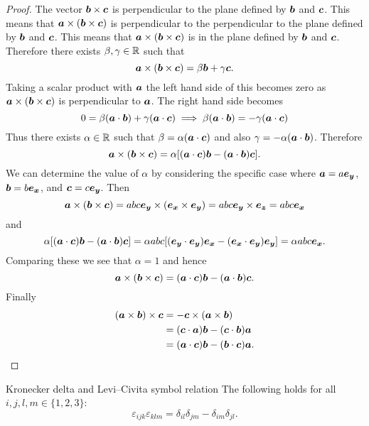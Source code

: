 \begin{proof}
    The vector \(\bm{b}\times\bm{c}\) is perpendicular to the plane defined by \(\bm{b}\) and \(\bm{c}\).
    This means that \(\bm{a}\times(\bm{b}\times\bm{c})\) is perpendicular to the perpendicular to the plane defined by \(\bm{b}\) and \(\bm{c}\).
    This means that \(\bm{a}\times(\bm{b}\times\bm{c})\) is in the plane defined by \(\bm{b}\) and \(\bm{c}\).
    Therefore there exists \(\beta, \gamma\in\mathbb{R}\) such that
    \[\bm{a}\times(\bm{b}\times\bm{c}) = \beta\bm{b} + \gamma\bm{c}.\]
    Taking a scalar product with \(\bm{a}\) the left hand side of this becomes zero as \(\bm{a}\times(\bm{b}\times\bm{c})\) is perpendicular to \(\bm{a}\).
    The right hand side becomes
    \[0 = \beta(\bm{a}\cdot\bm{b}) + \gamma(\bm{a}\cdot\bm{c}) \implies \beta(\bm{a}\cdot\bm{b}) = -\gamma(\bm{a}\cdot\bm{c})\]
    Thus there exists \(\alpha\in\mathbb{R}\) such that \(\beta = \alpha(\bm{a}\cdot\bm{c})\) and also \(\gamma = -\alpha(\bm{a}\cdot\bm{b})\).
    Therefore
    \[\bm{a}\times(\bm{b}\times\bm{c}) = \alpha[(\bm{a}\cdot\bm{c})\bm{b} - (\bm{a}\cdot\bm{b})\bm{c}].\]
    We can determine the value of \(\alpha\) by considering the specific case where \(\bm{a} = a\bm{e_{y}}\), \(\bm{b} = b\bm{e_{x}}\), and \(\bm{c} = c\bm{e_{y}}\).
    Then
    \[\bm{a}\times(\bm{b}\times\bm{c}) = abc\bm{e_{y}}\times(\bm{e_{x}}\times\bm{e_{y}}) = abc\bm{e_{y}}\times\bm{e_{z}} = abc\bm{e_{x}}\]
    and
    \[\alpha[(\bm{a}\cdot\bm{c})\bm{b} - (\bm{a}\cdot\bm{b})\bm{c}] = \alpha abc[(\bm{e_{y}}\cdot\bm{e_{y}})\bm{e_{x}} - (\bm{e_{x}}\cdot\bm{e_{y}})\bm{e_{y}}] = \alpha abc\bm{e_{x}}.\]
    Comparing these we see that \(\alpha = 1\) and hence
    \[\bm{a}\times(\bm{b}\times\bm{c}) = (\bm{a}\cdot\bm{c})\bm{b} - (\bm{a}\cdot\bm{b})\bm{c}.\]
    Finally
    \begin{align*}
        (\bm{a}\times\bm{b})\times\bm{c} &= -\bm{c}\times(\bm{a}\times\bm{b})\\
        &= (\bm{c}\cdot\bm{a})\bm{b} - (\bm{c}\cdot\bm{b})\bm{a}\\
        &= (\bm{a}\cdot\bm{c})\bm{b} - (\bm{b}\cdot\bm{c})\bm{a}.
    \end{align*}
\end{proof}
\begin{corollary}{Kronecker delta and Levi--Civita symbol relation}{}
    The following holds for all \(i, j, l, m \in \{1, 2, 3\}\):
    \[\varepsilon_{ijk}\varepsilon_{klm} = \delta_{il}\delta_{jm} - \delta_{im}\delta_{jl}.\]
\end{corollary}
